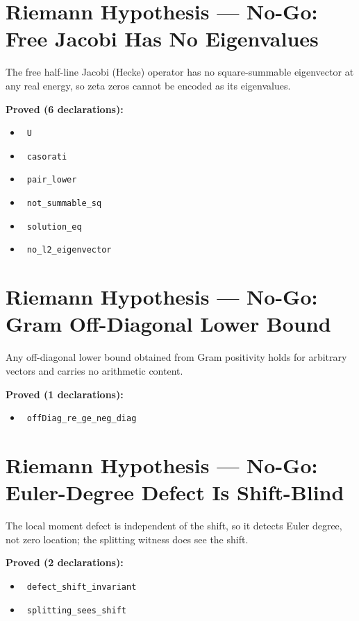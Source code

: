 \documentclass{report}
\theoremstyle{definition}
\begin{document}
\section{Riemann Hypothesis --- No-Go: Free Jacobi Has No Eigenvalues}
The free half-line Jacobi (Hecke) operator has no square-summable eigenvector at any real energy, so zeta zeros cannot be encoded as its eigenvalues.

\noindent\textbf{Proved (6 declarations):}
\begin{itemize}
  \item {}\leanok\ \texttt{U}
  \item {}\leanok\ \texttt{casorati}
  \item {}\leanok\ \texttt{pair\_lower}
  \item {}\leanok\ \texttt{not\_summable\_sq}
  \item {}\leanok\ \texttt{solution\_eq}
  \item {}\leanok\ \texttt{no\_l2\_eigenvector}
\end{itemize}

\section{Riemann Hypothesis --- No-Go: Gram Off-Diagonal Lower Bound}
Any off-diagonal lower bound obtained from Gram positivity holds for arbitrary vectors and carries no arithmetic content.

\noindent\textbf{Proved (1 declarations):}
\begin{itemize}
  \item {}\leanok\ \texttt{offDiag\_re\_ge\_neg\_diag}
\end{itemize}

\section{Riemann Hypothesis --- No-Go: Euler-Degree Defect Is Shift-Blind}
The local moment defect is independent of the shift, so it detects Euler degree, not zero location; the splitting witness does see the shift.

\noindent\textbf{Proved (2 declarations):}
\begin{itemize}
  \item {}\leanok\ \texttt{defect\_shift\_invariant}
  \item {}\leanok\ \texttt{splitting\_sees\_shift}
\end{itemize}
\end{document}
